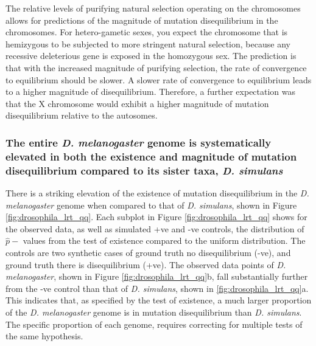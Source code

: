 The relative levels of purifying natural selection operating on the chromosomes allows for predictions of the magnitude of mutation disequilibrium in the chromosomes. For hetero-gametic sexes, you expect the chromosome that is hemizygous to be subjected to more stringent natural selection, because any recessive deleterious gene is exposed in the homozygous sex. The prediction is that with the increased magnitude of purifying selection, the rate of convergence to equilibrium should be slower. A slower rate of convergence to equilibrium leads to a higher magnitude of disequilibrium. Therefore, a further expectation was that the X chromosome would exhibit a higher magnitude of mutation disequilibrium relative to the autosomes. 

\subsubsection*{The entire \textit{D. melanogaster} genome is systematically elevated in both the existence and magnitude of mutation disequilibrium compared to its sister taxa, \textit{D. simulans}}

There is a striking elevation of the existence of mutation disequilibrium in the \textit{D. melanogaster} genome when compared to that of \textit{D. simulans}, shown in Figure \ref{fig:drosophila_lrt_qq}. Each subplot in Figure \ref{fig:drosophila_lrt_qq} shows for the observed data, as well as simulated +ve and -ve controls, the distribution of $\hat p-$ values from the test of existence compared to the uniform distribution. The controls are two synthetic cases of ground truth no disequilibrium (-ve), and ground truth there is disequilibrium (+ve). The observed data points of \textit{D. melanogaster}, shown in Figure \ref{fig:drosophila_lrt_qq}b, fall substantially further from the -ve control than that of \textit{D. simulans}, shown in \ref{fig:drosophila_lrt_qq}a. This indicates that, as specified by the test of existence, a much larger proportion of the \textit{D. melanogaster} genome is in mutation disequilibrium than \textit{D. simulans}. The specific proportion of each genome, requires correcting for multiple tests of the same hypothesis. 



